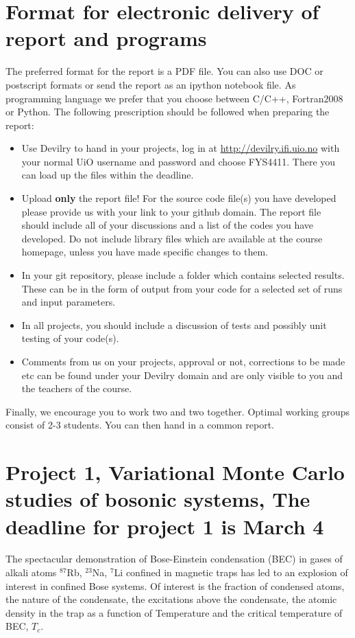 \documentclass[10pt]{article}
\begin{document}
\section*{Format for electronic delivery of report and programs}
%
The preferred format for the report is a PDF file. You can also
use DOC or postscript formats or send the report as an ipython notebook file. 
As programming language we prefer that you choose between C/C++, Fortran2008 or Python.
The following prescription should be followed when preparing the report:
\begin{itemize}
\item Use Devilry to hand in your projects, log in  at \url{http://devilry.ifi.uio.no} with your normal UiO username and password
and choose FYS4411.
There you can load up the files within the deadline.
\item Upload {\bf only} the report file!  For the source code file(s) you have developed please provide us with your link to your github domain. 
The report file should include all of your discussions and a list of the codes you have developed. 
Do not include library files which are available at the course homepage, unless you have
made specific changes to them.
\item In your git repository, please include a folder which contains selected results. These can be in the form of output from your code
for a selected set of runs and input parameters. 
\item In all projects, you should include a discussion of tests and possibly unit testing of your code(s).
\item Comments  from us on your projects, approval or not, corrections to be made 
etc can be found under
your Devilry domain and are only visible to you and the teachers of the course.

\end{itemize}

Finally, 
we encourage you to work two and two together. Optimal working groups consist of 
2-3 students. You can then hand in a common report. 


\section*{Project 1, Variational Monte Carlo studies of bosonic systems, The deadline for project 1 is March 4}

 The spectacular demonstration of Bose-Einstein condensation (BEC) in gases of
 alkali atoms $^{87}$Rb, $^{23}$Na, $^7$Li confined in magnetic
 traps has led to an explosion of interest in
 confined Bose systems. Of interest is the fraction of condensed atoms, the
 nature of the condensate, the excitations above the condensate, the atomic
 density in the trap as a function of Temperature and the critical temperature of BEC,
 $T_c$. 
\end{document}
